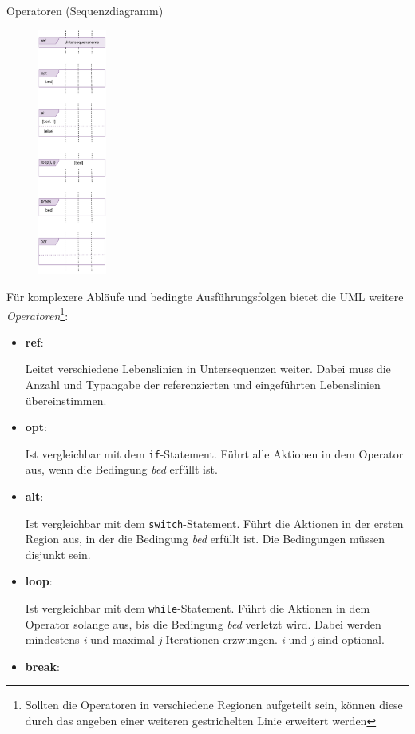 \begin{diag}{Operatoren (Sequenzdiagramm)}
    \begin{figure}
        \centering
        \includegraphics[width=0.2\textwidth]{includes/figures/defi_diagrams_sequenz_operators.pdf}
    \end{figure}
    Für komplexere Abläufe und bedingte Ausführungsfolgen bietet die UML weitere \emph{Operatoren}\footnote{Sollten die Operatoren in verschiedene Regionen aufgeteilt sein, können diese durch das angeben einer weiteren gestrichelten Linie erweitert werden}:
    \begin{itemize}
        \item \textbf{ref}:

              Leitet verschiedene Lebenslinien in Untersequenzen weiter.
              Dabei muss die Anzahl und Typangabe der referenzierten und eingeführten Lebenslinien übereinstimmen.
        \item \textbf{opt}:

              Ist vergleichbar mit dem \texttt{if}-Statement.
              Führt alle Aktionen in dem Operator aus, wenn die Bedingung \emph{bed} erfüllt ist.
        \item \textbf{alt}:

              Ist vergleichbar mit dem \texttt{switch}-Statement.
              Führt die Aktionen in der ersten Region aus, in der die Bedingung \emph{bed} erfüllt ist.
              Die Bedingungen müssen disjunkt sein.
        \item \textbf{loop}:

              Ist vergleichbar mit dem \texttt{while}-Statement.
              Führt die Aktionen in dem Operator solange aus, bis die Bedingung \emph{bed} verletzt wird.
              Dabei werden mindestens \emph{i} und maximal \emph{j} Iterationen erzwungen.
              \emph{i} und \emph{j} sind optional.
        \item \textbf{break}:


\end{itemize}
\end{diag}

